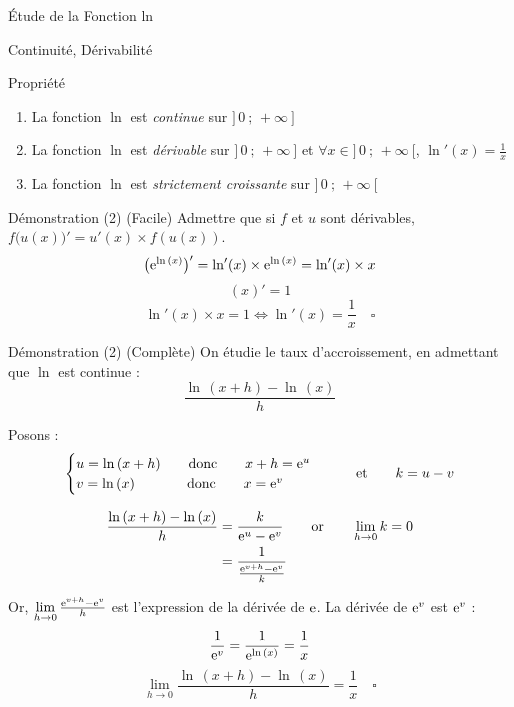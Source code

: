 \documentclass{coursbook}
\begin{document}
    \begin{Gpartie}{Étude de la Fonction ln}
        \begin{Spartie}{Continuité, Dérivabilité}
            \begin{SSpartie}{Propriété}
                \begin{enumerate}[(1)]
                    \item La fonction $\ln$ est \emph{continue} sur $\big]\,0~;\,+\infty~\big]$
                    \item La fonction $\ln$ est \emph{dérivable} sur $\big]\,0~;\,+\infty~\big]$ et $\forall x\in\big]\,0~;\,+\infty~\big[$, $\boxed{\ln'(x)=\frac{1}{x}}$
                    \item La fonction $\ln$ est \emph{strictement croissante} sur $\big]\,0~;\,+\infty~\big[$
                \end{enumerate}
                \begin{SSSpartie}{Démonstration (2) (Facile)}
                    Admettre que si $f$ et $u$ sont dérivables, $f\big(u(x)\big)'=u'(x)\times f(u(x))$.
                    \[\big(\mathrm{e}^{\ln\,(x)}\big)'=\ln'(x)\times \mathrm{e}^{\ln\,(x)}=\ln'(x)\times x\]
                    \[(x)'=1\]
                    \[\ln'(x)\times x=1\iff\ln'(x)=\frac{1}{x}\quad\square\]
                    
                \end{SSSpartie}
                \begin{SSSpartie}{Démonstration (2) (Complète)} 
                    On étudie le taux d'accroissement, en admettant que $\ln$ est continue :
                    \[\frac{\ln\,(x+h)-\ln\,(x)}{h}\]

                    Posons :
                    \[\begin{cases}
                        u=\ln\,(x+h)\qquad\text{donc}\qquad x+h=\mathrm{e}^u \\ v=\ln\,(x)\phantom{+h)}\text{\qquad donc\qquad} x=\mathrm{e}^v
                    \end{cases}\qquad\text{et}\qquad k=u-v\]

                    \[\begin{aligned}[t]
                        \frac{\ln\,(x+h)-\ln\,(x)}{h}&=\frac{k}{\me^u-\me^v}\qquad\text{or}\qquad\lim_{h\to0}k=0 \\
                        &=\frac{1}{\frac{\me^{v+h}-\me^v}{k}}
                    \end{aligned}\]

                    Or, $\lim\limits_{h\to0}\frac{\me^{v+h}-\me^v}{h}$ est l'expression de la dérivée de $\mathrm{e}$. La dérivée de $\mathrm{e}^v$ est $\mathrm{e}^v$ :
                    \[\frac{1}{\me^v}=\frac{1}{\me^{\ln\,(x)}}=\frac{1}{x}\]
                    \[\lim\limits_{h\to 0}\frac{\ln\,(x+h)-\ln\,(x)}{h}=\frac{1}{x}\quad\square\]


\end{SSSpartie}
\end{SSpartie}
\end{Spartie}
\end{Gpartie}
\end{document}
